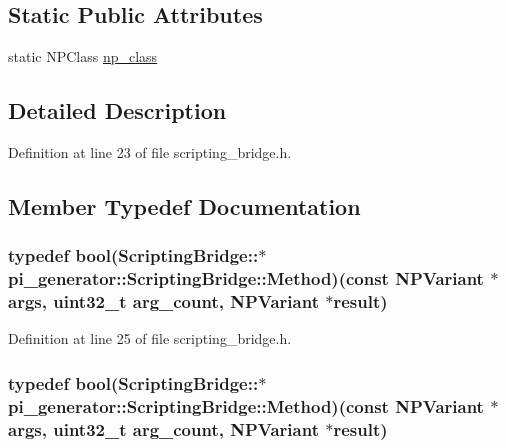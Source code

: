 \subsection*{Static Public Attributes}
\begin{DoxyCompactItemize}
\item 
static NPClass \hyperlink{classpi__generator_1_1_scripting_bridge_aed4a415c7f15933562413031d458792e}{np\_\-class}
\end{DoxyCompactItemize}


\subsection{Detailed Description}


Definition at line 23 of file scripting\_\-bridge.h.



\subsection{Member Typedef Documentation}
\hypertarget{classpi__generator_1_1_scripting_bridge_a48f5f7b0dfb3daabcdbfb3f7b667fd39}{
\subsubsection[{Method}]{\setlength{\rightskip}{0pt plus 5cm}typedef bool(ScriptingBridge::$\ast$ {\bf pi\_\-generator::ScriptingBridge::Method})(const NPVariant $\ast$args, uint32\_\-t arg\_\-count, NPVariant $\ast$result)}}
\label{classpi__generator_1_1_scripting_bridge_a48f5f7b0dfb3daabcdbfb3f7b667fd39}


Definition at line 25 of file scripting\_\-bridge.h.

\hypertarget{classpi__generator_1_1_scripting_bridge_a48f5f7b0dfb3daabcdbfb3f7b667fd39}{
\subsubsection[{Method}]{\setlength{\rightskip}{0pt plus 5cm}typedef bool(ScriptingBridge::$\ast$ {\bf pi\_\-generator::ScriptingBridge::Method})(const NPVariant $\ast$args, uint32\_\-t arg\_\-count, NPVariant $\ast$result)}}
\label{classpi__generator_1_1_scripting_bridge_a48f5f7b0dfb3daabcdbfb3f7b667fd39}


